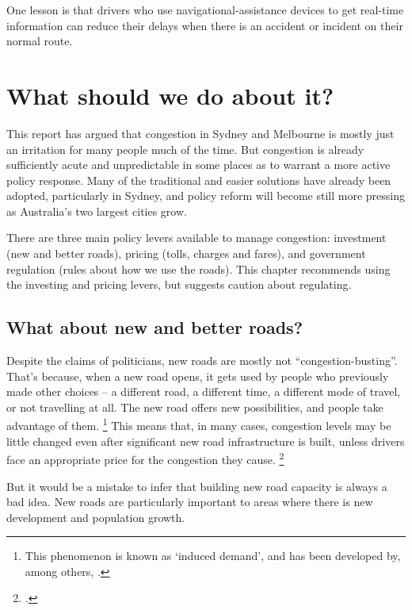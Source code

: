 \documentclass{grattan}
\begin{document}
One lesson is that drivers who use navigational-assistance devices to get real-time information can reduce their delays when there is an accident or incident on their normal route.

\chapter{What should we do about it?}\label{chap:what-should-we-do-about-it}

This report has argued that congestion in Sydney and Melbourne is mostly just an irritation for many people much of the time.
But congestion is already sufficiently acute and unpredictable in some places as to warrant a more active policy response. Many of the traditional and easier solutions have already been adopted, particularly in Sydney, and policy reform will become still more pressing as Australia's two largest cities grow.

There are three main policy levers available to manage congestion: investment (new and better roads), pricing (tolls, charges and fares), and government regulation (rules about how we use the roads).
This chapter recommends using the investing and pricing levers, but suggests caution about regulating.

\section{What about new and better roads?}\label{sec:Consider-alternatives-to-building-new-roads}

Despite the claims of politicians, new roads are mostly not ``congestion-busting''.
That's because, when a new road opens, it gets used by people who previously made other choices  -- a different road, a different time, a different mode of travel, or not travelling at all.
The new road offers new possibilities, and people take advantage of them.%
\footnote{This phenomenon is known as ‘induced demand', and has been developed by, among others, \textcites{1991-Small-Urban-transport-economics}{1962-Downs-peak-hour-congestion}.}
This means that, in many cases, congestion levels may be  little changed even after significant new road infrastructure is built, unless drivers face an appropriate price for the congestion they cause.%
    \footcite{Duranton-Turner-2009-Fundamental-Law-of-Road-Congestion}

But it would be a mistake to infer that building new road capacity is always a bad idea. New roads are particularly important to areas where there is new development and population growth.
\end{document}
